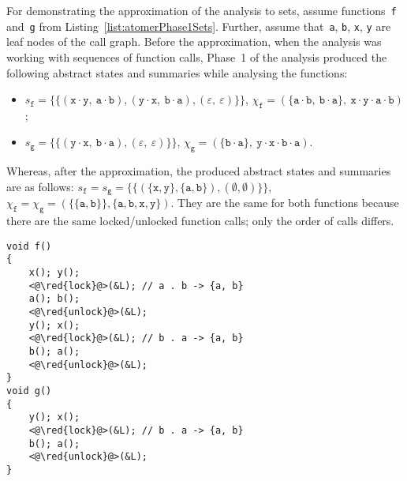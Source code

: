 \begin{example}
    For demonstrating the approximation of the analysis to sets, assume functions~\texttt{f} and~\texttt{g} from Listing~\ref{list:atomerPhase1Sets}. Further, assume that~\texttt{a}, \texttt{b}, \texttt{x}, \texttt{y} are leaf nodes of the call graph. Before the approximation, when the analysis was working with sequences of function calls, Phase~1 of the analysis produced the following abstract states and summaries while analysing the functions:
    \begin{itemize}
        \item $ s_\mathtt{f} = \{\{(\mathtt{x} \cdot \mathtt{y},\ \mathtt{a} \cdot \mathtt{b}), (\mathtt{y} \cdot \mathtt{x},\ \mathtt{b} \cdot \mathtt{a}), (\varepsilon,\ \varepsilon)\}\} $, $ \chi_\mathtt{f} = (\{\mathtt{a} \cdot \mathtt{b},\ \mathtt{b} \cdot \mathtt{a}\},\ \mathtt{x} \cdot \mathtt{y} \cdot \mathtt{a} \cdot \mathtt{b}) $;

        \item $ s_\mathtt{g} = \{\{(\mathtt{y} \cdot \mathtt{x},\ \mathtt{b} \cdot \mathtt{a}), (\varepsilon,\ \varepsilon)\}\} $, $ \chi_\mathtt{g} = (\{\mathtt{b} \cdot \mathtt{a}\},\ \mathtt{y} \cdot \mathtt{x} \cdot \mathtt{b} \cdot \mathtt{a}) $.
    \end{itemize}
    Whereas, after the approximation, the produced abstract states and summaries are as follows: $ s_\mathtt{f} = s_\mathtt{g} = \{\{(\{\mathtt{x}, \mathtt{y}\}, \{\mathtt{a}, \mathtt{b}\}), (\emptyset, \emptyset)\}\} $, $ \chi_\mathtt{f} = \chi_\mathtt{g} = (\{\{\mathtt{a}, \mathtt{b}\}\}, \{\mathtt{a}, \mathtt{b}, \mathtt{x}, \mathtt{y}\}) $. They are the same for both functions because there are the same locked/unlocked function calls; only the order of calls differs.
\end{example}

\begin{lstlisting}[style=c, label={list:atomerPhase1Sets}, float=hbt, caption={A~code snippet used to illustrate the proposed \emph{approximation} of the first phase of the analysis in a~new version of Atomer using \emph{sets of function calls}}]
void f()
{
    x(); y();
    <@\red{lock}@>(&L); // a . b -> {a, b}
    a(); b();
    <@\red{unlock}@>(&L);
    y(); x();
    <@\red{lock}@>(&L); // b . a -> {a, b}
    b(); a();
    <@\red{unlock}@>(&L);
}
void g()
{
    y(); x();
    <@\red{lock}@>(&L); // b . a -> {a, b}
    b(); a();
    <@\red{unlock}@>(&L);
}
\end{lstlisting}

